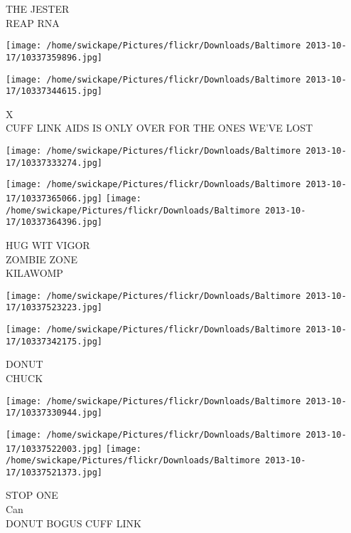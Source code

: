 \documentclass[10pt,letterpaper]{article}
\begin{document}
THE JESTER\\
REAP RNA\\
\pagebreak

\texttt{[image: /home/swickape/Pictures/flickr/Downloads/Baltimore 2013-10-17/10337359896.jpg]}

\vspace{0.25in}
\texttt{[image: /home/swickape/Pictures/flickr/Downloads/Baltimore 2013-10-17/10337344615.jpg]}

X\\
CUFF LINK AIDS IS ONLY OVER FOR THE ONES WE'VE LOST\\
\pagebreak

\texttt{[image: /home/swickape/Pictures/flickr/Downloads/Baltimore 2013-10-17/10337333274.jpg]}

\vspace{0.25in}
\texttt{[image: /home/swickape/Pictures/flickr/Downloads/Baltimore 2013-10-17/10337365066.jpg]}
\texttt{[image: /home/swickape/Pictures/flickr/Downloads/Baltimore 2013-10-17/10337364396.jpg]}

HUG WIT VIGOR\\
ZOMBIE ZONE\\
KILAWOMP\\
\pagebreak

\texttt{[image: /home/swickape/Pictures/flickr/Downloads/Baltimore 2013-10-17/10337523223.jpg]}

\vspace{0.25in}
\texttt{[image: /home/swickape/Pictures/flickr/Downloads/Baltimore 2013-10-17/10337342175.jpg]}

DONUT\\
CHUCK\\
\pagebreak

\texttt{[image: /home/swickape/Pictures/flickr/Downloads/Baltimore 2013-10-17/10337330944.jpg]}

\vspace{0.25in}
\texttt{[image: /home/swickape/Pictures/flickr/Downloads/Baltimore 2013-10-17/10337522003.jpg]}
\texttt{[image: /home/swickape/Pictures/flickr/Downloads/Baltimore 2013-10-17/10337521373.jpg]}

STOP ONE\\
Can\\
DONUT BOGUS CUFF LINK\\
\pagebreak
\end{document}
